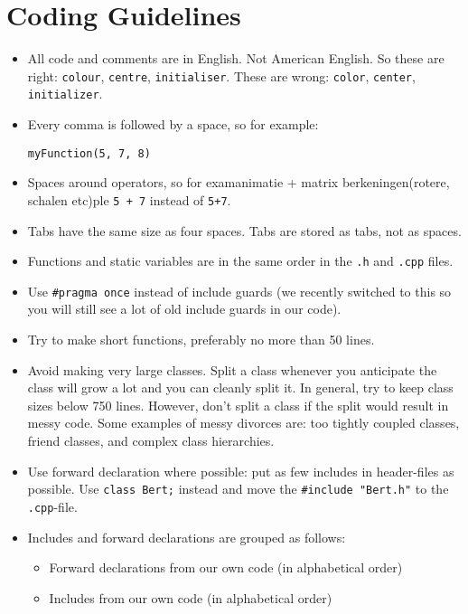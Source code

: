 \documentclass{article}
\begin{document}
\section*{Coding Guidelines}

\begin{itemize}
    \item All code and comments are in English. Not American English. So these are right: \texttt{colour}, \texttt{centre}, \texttt{initialiser}. These are wrong: \texttt{color}, \texttt{center}, \texttt{initializer}.
    \item Every comma is followed by a space, so for example:
    \begin{Verbatim}[fontsize=\small]
    myFunction(5, 7, 8)
    \end{Verbatim}
    \item Spaces around operators, so for examanimatie + matrix berkeningen(rotere, schalen etc)ple \texttt{5 + 7} instead of \texttt{5+7}.
    \item Tabs have the same size as four spaces. Tabs are stored as tabs, not as spaces.
    \item Functions and static variables are in the same order in the \texttt{.h} and \texttt{.cpp} files.
    \item Use \texttt{\#pragma once} instead of include guards (we recently switched to this so you will still see a lot of old include guards in our code).
    \item Try to make short functions, preferably no more than 50 lines.
    \item Avoid making very large classes. Split a class whenever you anticipate the class will grow a lot and you can cleanly split it. In general, try to keep class sizes below 750 lines. However, don't split a class if the split would result in messy code. Some examples of messy divorces are: too tightly coupled classes, friend classes, and complex class hierarchies.
    \item Use forward declaration where possible: put as few includes in header-files as possible. Use \texttt{class Bert;} instead and move the \texttt{\#include "Bert.h"} to the \texttt{.cpp}-file.
    \item Includes and forward declarations are grouped as follows:
    \begin{itemize}
        \item Forward declarations from our own code (in alphabetical order)
        \item Includes from our own code (in alphabetical order)

\end{itemize}
\end{itemize}
\end{document}
